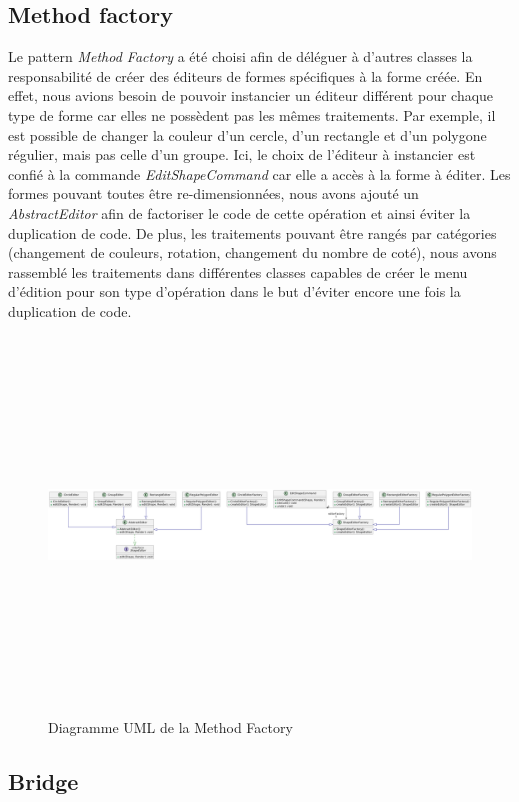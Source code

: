 \documentclass{article}
\begin{document}
\subsection{Method factory}
Le pattern \textit{Method Factory} a été choisi afin de déléguer à d'autres classes la responsabilité de créer des éditeurs de formes
spécifiques à la forme créée. En effet, nous avions besoin de pouvoir instancier un éditeur différent pour chaque type de forme car elles
ne possèdent pas les mêmes traitements. Par exemple, il est possible de changer la couleur d'un cercle, d'un rectangle et d'un polygone régulier, mais pas celle d'un groupe.
Ici, le choix de l'éditeur à instancier est confié à la commande \textit{EditShapeCommand} car elle a accès à la forme à éditer. Les formes pouvant toutes
être re-dimensionnées, nous avons ajouté un \textit{AbstractEditor} afin de factoriser le code de cette opération et ainsi éviter la duplication de code.
De plus, les traitements pouvant être rangés par catégories (changement de couleurs, rotation, changement du nombre de coté), nous avons rassemblé les traitements
dans différentes classes capables de créer le menu d'édition pour son type d'opération dans le but d'éviter encore une fois la duplication de code.
\begin{figure}[h]
    \centering
    \includegraphics[width=\textwidth,height=10.0cm,keepaspectratio]{methodFactory.png}
    \caption{Diagramme UML de la Method Factory}
    \label{MethodFactory}
\end{figure}
\FloatBarrier
\subsection{Bridge}
\end{document}
